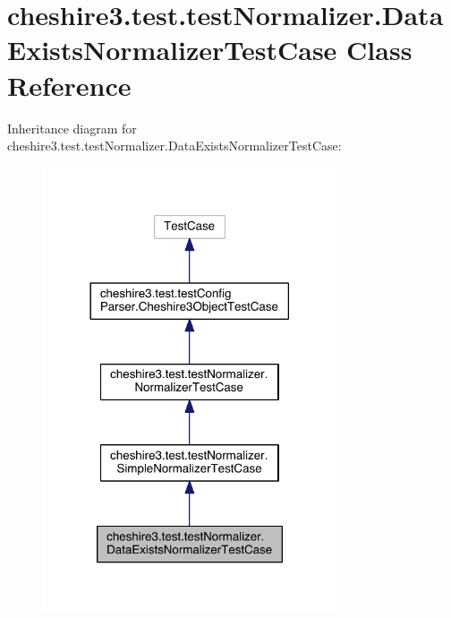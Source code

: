 \hypertarget{classcheshire3_1_1test_1_1test_normalizer_1_1_data_exists_normalizer_test_case}{\section{cheshire3.\-test.\-test\-Normalizer.\-Data\-Exists\-Normalizer\-Test\-Case Class Reference}
\label{classcheshire3_1_1test_1_1test_normalizer_1_1_data_exists_normalizer_test_case}
}


Inheritance diagram for cheshire3.\-test.\-test\-Normalizer.\-Data\-Exists\-Normalizer\-Test\-Case\-:
\nopagebreak
\begin{figure}[H]
\begin{center}
\leavevmode
\includegraphics[width=246pt]{classcheshire3_1_1test_1_1test_normalizer_1_1_data_exists_normalizer_test_case__inherit__graph}
\end{center}
\end{figure}


